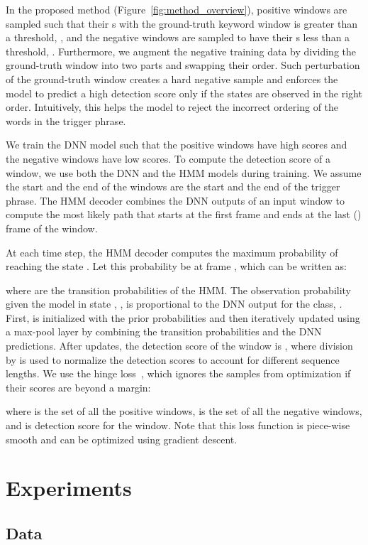 \documentclass{article}
\begin{document}
In the proposed method (Figure~\ref{fig:method_overview}), positive windows are sampled such that their s with the ground-truth keyword window is greater than a threshold, , and the negative windows are sampled to have their s less than a threshold, .
Furthermore, we augment the negative training data by dividing the ground-truth window into two parts and swapping their order.
Such perturbation of the ground-truth window creates a hard negative sample and enforces the model to predict a high detection score only if the states are observed in the right order.
Intuitively, this helps the model to reject the incorrect ordering of the words in the trigger phrase.

We train the DNN model such that the positive windows have high scores and the negative windows have low scores.
To compute the detection score of a window, we use both the DNN and the HMM models during training.
We assume the start and the end of the windows are the start and the end of the trigger phrase.
The HMM decoder combines the DNN outputs of an input window to compute the most likely path that starts at the first frame and ends at the last () frame of the window.


At each time step, the HMM decoder computes the maximum probability of reaching the state .
Let this probability be  at frame , which can be written as:

where  are the transition probabilities of the HMM.
The observation probability given the model in state , , is proportional to the DNN output for the  class, .
First,  is initialized with the prior probabilities and then iteratively updated using a max-pool layer by combining the transition probabilities and the DNN predictions.
After  updates, the detection score of the window is , where division by  is used to normalize the detection scores to account for different sequence lengths.
We use the hinge loss~\cite{hinge_loss}, which ignores the samples from optimization if their scores are beyond a margin:

where  is the set of all the positive windows,  is the set of all the negative windows, and  is detection score for the  window.
Note that this loss function is piece-wise smooth and can be optimized using gradient descent.
 \section{Experiments}
 
\subsection{Data}
\end{document}
